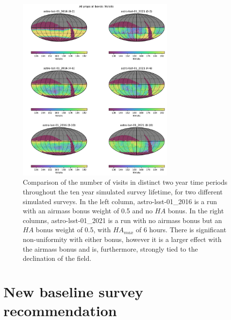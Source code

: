 \documentclass[DM,lsstdraft,authoryear,toc]{lsstdoc}
\begin{document}
\begin{figure}[ht]
\centering
\includegraphics[width=0.7\textwidth]{figures/nvisits_comp_maps}
\caption{Comparison of the number of visits in distinct two year time periods throughout the ten year simulated survey lifetime, for two different simulated surveys. In the left column, astro-lsst-01\_2016 is a run with an airmass bonus weight of 0.5 and no $HA$ bonus. In the right columns, astro-lsst-01\_2021 is a run with no airmass bonus but an $HA$ bonus weight of 0.5, with $HA_{max}$ of 6 hours. There is significant non-uniformity with either bonus, however it is a larger effect with the airmass bonus and is, furthermore, strongly tied to the declination of the field.
\label{fig:nvisits_comp_maps}}
\end{figure}


\section{New baseline survey recommendation}
\end{document}
